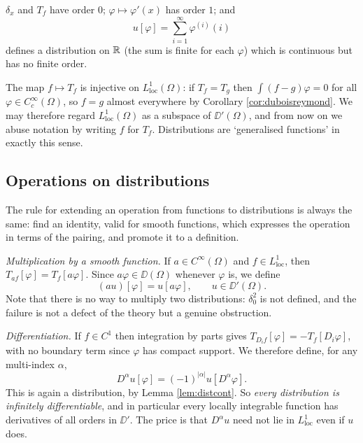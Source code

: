 \documentclass[a4paper]{scrartcl}
\begin{document}
\begin{example}
	$\delta_x$ and $T_f$ have order $0$; $\varphi \mapsto \varphi'(x)$ has order $1$; and
	$$u[\varphi]=\sum_{i=1}^\infty \varphi^{(i)}(i)$$
	defines a distribution on $\mathbb{R}$ (the sum is finite for each $\varphi$) which is continuous but has no finite order.
\end{example}

The map $f \mapsto T_f$ is injective on $L^1_{\mathrm{loc}}(\Omega)$: if $T_f = T_g$ then $\int(f-g)\varphi = 0$ for all $\varphi\in C_c^\infty(\Omega)$, so $f = g$ almost everywhere by Corollary \ref{cor:duboisreymond}. We may therefore regard $L^1_{\mathrm{loc}}(\Omega)$ as a subspace of $\DD'(\Omega)$, and from now on we abuse notation by writing $f$ for $T_f$. Distributions are `generalised functions' in exactly this sense.

\subsection{Operations on distributions}

The rule for extending an operation from functions to distributions is always the same: find an identity, valid for smooth functions, which expresses the operation in terms of the pairing, and promote it to a definition.

\emph{Multiplication by a smooth function.} If $a \in C^\infty(\Omega)$ and $f \in L^1_{\mathrm{loc}}$, then $T_{af}[\varphi]=T_f[a\varphi]$. Since $a\varphi \in \DD(\Omega)$ whenever $\varphi$ is, we define
$$(au)[\varphi]=u[a\varphi], \qquad u \in \DD'(\Omega).$$
Note that there is no way to multiply two distributions: $\delta_0^2$ is not defined, and the failure is not a defect of the theory but a genuine obstruction.

\emph{Differentiation.} If $f \in C^1$ then integration by parts gives $T_{D_if}[\varphi]=-T_f[D_i\varphi]$, with no boundary term since $\varphi$ has compact support. We therefore define, for any multi-index $\alpha$,
$$D^\alpha u[\varphi]=(-1)^{|\alpha|}u[D^\alpha \varphi].$$
This is again a distribution, by Lemma \ref{lem:distcont}. So \emph{every distribution is infinitely differentiable}, and in particular every locally integrable function has derivatives of all orders in $\DD'$. The price is that $D^\alpha u$ need not lie in $L^1_{\mathrm{loc}}$ even if $u$ does.
\end{document}
